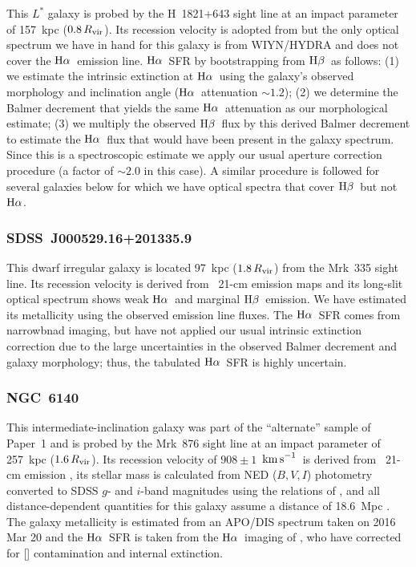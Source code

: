 \documentclass[twocolumn,twocolappendix,tighten,times]{aastex6}
\newcommand{\HI}{\ion{H}{1}}
\newcommand{\NII}{\ion{N}{2}}
\newcommand{\Ha}{\ensuremath{{\rm H}\alpha}}
\newcommand{\Hb}{\ensuremath{{\rm H}\beta}}
\newcommand{\kms}{\ensuremath{{\rm km\,s}^{-1}}}
\begin{document}
This $L^*$ galaxy is probed by the H~1821+643 sight line at an impact parameter
of 157~kpc ($0.8\,R_{\rm vir}$). Its recession velocity is adopted from 
\citet{tripp98} but the only optical spectrum we have in hand for this galaxy 
is from WIYN/HYDRA and does not cover the \Ha\ emission line. 
\Ha\ SFR by bootstrapping from \Hb\ as follows: (1) we estimate the intrinsic 
extinction at \Ha\ using the galaxy's observed morphology and inclination angle 
(\Ha\ attenuation $\sim1.2$); (2) we determine the Balmer decrement 
\citep[$\sim3.2$ assuming an intrinsic value of 2.87;][]{calzetti01} that yields 
the same \Ha\ attenuation as our morphological estimate; (3) we multiply the 
observed \Hb\ flux by this derived Balmer decrement to estimate the \Ha\ flux that 
would have been present in the galaxy spectrum. Since this is a spectroscopic 
estimate we apply our usual aperture correction procedure (a factor of $\sim2.0$ 
in this case). A similar procedure is followed for several galaxies below for which 
we have optical spectra that cover \Hb\ but not \Ha.


\subsubsection{SDSS~J000529.16+201335.9}
\label{indiv:galaxies:sdssj0005+20}

This dwarf irregular galaxy is located 97~kpc ($1.8\,R_{\rm vir}$) from the 
Mrk~335 sight line. Its recession velocity is derived from \HI\ 21-cm emission 
maps \citep{vangorkom96} and its long-slit optical spectrum shows weak \Ha\ and 
marginal \Hb\ emission. We have estimated its metallicity using the observed 
emission line fluxes. The \Ha\ SFR comes from narrowbnad imaging, but have not 
applied our usual intrinsic extinction correction due to the large uncertainties 
in the observed Balmer decrement and galaxy morphology; thus, the tabulated \Ha\ 
SFR is highly uncertain. 


\subsubsection{NGC~6140}
\label{indiv:galaxies:ngc6140}

This intermediate-inclination galaxy was part of the ``alternate'' sample of 
Paper~1 and is probed by the Mrk~876 sight line at an impact parameter of 
257~kpc ($1.6\,R_{\rm vir}$). Its recession velocity of $908\pm1$~\kms\ is 
derived from \HI\ 21-cm emission \citep{springob05}, its stellar mass is 
calculated from NED ($B,V,I$) photometry converted to SDSS $g$- and $i$-band 
magnitudes using the relations of \citet{jester05}, and all distance-dependent
quantities for this galaxy assume a distance of 18.6~Mpc \citep{tully88}.
The galaxy metallicity is estimated from an APO/DIS spectrum taken on 
2016 Mar 20 and the \Ha\ SFR is taken from the \Ha\ imaging of
 \citet{sanchez-gallego12}, who have corrected for [\NII] contamination
and internal extinction.
\end{document}
